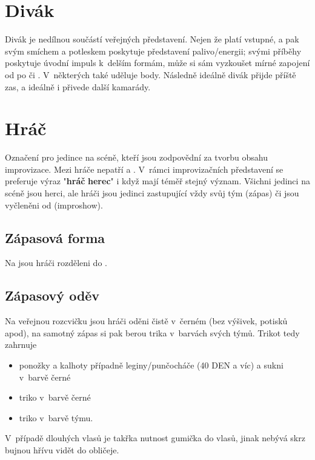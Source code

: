 \needspace{5cm} \section{Divák} \label{divák} Divák je nedílnou součástí veřejných představení. 
Nejen že platí vstupné, a pak svým smíchem a potleskem poskytuje představení palivo/energii; svými příběhy poskytuje úvodní impuls k~delším formám, může si sám vyzkoušet mírné zapojení od  po  či .   V~některých  také uděluje body. 
Následně ideálně divák přijde příště zas, a ideálně i přivede další kamarády. 
 
 
\needspace{5cm} \section{Hráč} \label{hráč} Označení pro jedince na scéně, kteří jsou zodpovědní za tvorbu obsahu improvizace. Mezi hráče nepatří  a . V~rámci improvizačních představení se preferuje výraz "\textbf{hráč} \textbf{herec}"{} i když mají téměř stejný význam. Všichni jedinci na scéně jsou herci, ale hráči jsou jedinci zastupující vždy svůj tým (zápas) či jsou vyčleněni od  (improshow).  
 
\subsection{ Zápasová forma } Na  jsou hráči rozděleni do . 
 
\subsection{ Zápasový oděv } Na veřejnou rozcvičku jsou hráči oděni čistě v~černém (bez výšivek, potisků apod),  
na samotný zápas si pak berou trika v~barvách svých týmů. 
Trikot tedy zahrnuje 
\begin{itemize}
\item ponožky a kalhoty   případně leginy/punčocháče (40 DEN a víc) a sukni v~barvě černé
\item triko v~barvě černé
\item triko v~barvě týmu.
\end{itemize}
V~případě dlouhých vlasů je takřka nutnost gumička do vlasů, jinak nebývá skrz bujnou hřívu vidět do obličeje. 
 
